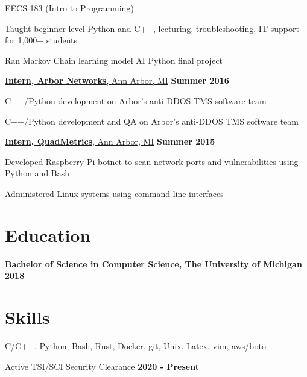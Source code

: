 \documentclass[margin,line]{resume}
\begin{document}
\begin{resume}
    \begin{list2}
    \item EECS 183 (Intro to Programming)
    \item Taught beginner-level Python and C++, lecturing, troubleshooting, IT support for 1,000+ students
    \item Ran Markov Chain learning model AI Python final project
    \end{list2}

    \underline{\textbf{Intern, Arbor Networks}, Ann Arbor, MI}
    \hfill \textbf{Summer 2016} \\

    \begin{list2}
    \item C++/Python development on Arbor's anti-DDOS TMS software team
    \item C++/Python development and QA on Arbor's anti-DDOS TMS software team
    \end{list2}

    \underline{\textbf{Intern, QuadMetrics}, Ann Arbor, MI}
    \hfill \textbf{\hfill Summer 2015} \\

    \begin{list2}
    \item Developed Raspberry Pi botnet to scan network ports and vulnerabilities using Python and Bash
    \item Administered Linux systems using command line interfaces
    \end{list2}

    \section{\mysidestyle Education}
    \hfill

    \textbf{Bachelor of Science in Computer Science, The University of Michigan}
    \hfill \textbf{\hfill 2018}

    \section{\mysidestyle Skills}
    \hfill

    \begin{list2}
    \item C/C++, Python, Bash, Rust, Docker, git, Unix, Latex, vim, aws/boto
    \item Active TSI/SCI Security Clearance \hfill \textbf{2020 - Present}
    \end{list2}


\end{resume}
\end{document}
